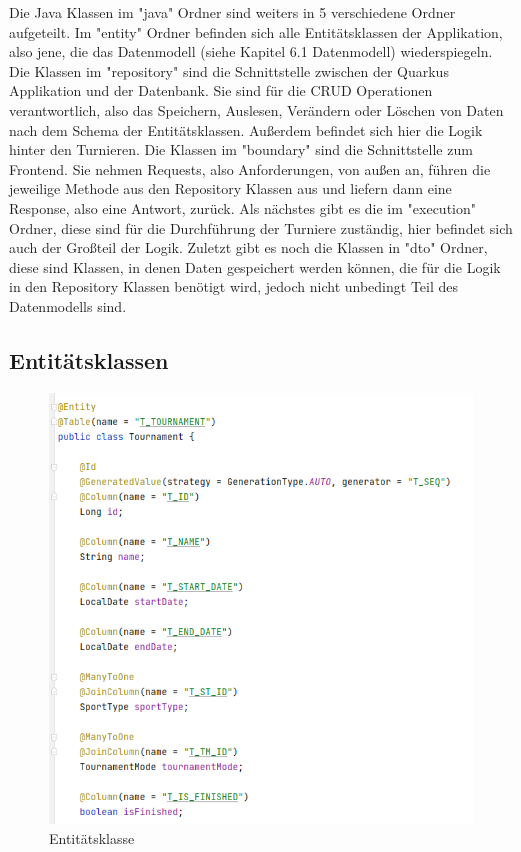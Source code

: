 Die Java Klassen im "java" Ordner sind weiters in 5 verschiedene Ordner aufgeteilt. Im "entity" Ordner befinden sich alle Entitätsklassen der Applikation, also jene, die das Datenmodell (siehe Kapitel 6.1 Datenmodell) wiederspiegeln.
Die Klassen im "repository" sind die Schnittstelle zwischen der Quarkus Applikation und der Datenbank. Sie sind für die CRUD Operationen verantwortlich, also das Speichern, Auslesen, Verändern oder Löschen von Daten nach dem Schema der Entitätsklassen.
Außerdem befindet sich hier die Logik hinter den Turnieren. Die Klassen im "boundary" sind die Schnittstelle zum Frontend. Sie nehmen Requests, also Anforderungen, von außen an, 
führen die jeweilige Methode aus den Repository Klassen aus und liefern dann eine Response, also eine Antwort, zurück. Als nächstes gibt es die im "execution" Ordner, diese sind für die Durchführung der Turniere zuständig, hier befindet sich auch der Großteil der Logik. 
Zuletzt gibt es noch die Klassen in "dto" Ordner, diese sind Klassen, in denen Daten gespeichert werden können, die für die Logik in den Repository Klassen benötigt wird, jedoch nicht unbedingt Teil des Datenmodells sind.

\subsection{Entitätsklassen}

\begin{figure}[H]
    \includegraphics[scale=0.8]{pics/backend/entity_class.png}
    \caption{Entitätsklasse}
\end{figure}

